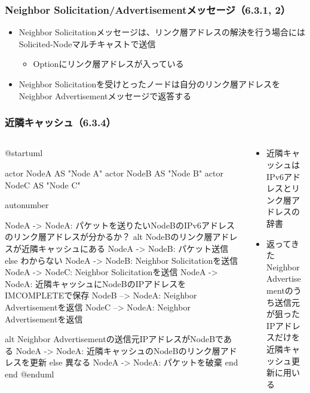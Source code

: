 \begin{frame}
  \frametitle{Neighbor Solicitation/Advertisementメッセージ（6.3.1, 2）}

  \begin{itemize}
    \item Neighbor Solicitationメッセージは、リンク層アドレスの解決を行う場合にはSolicited-Nodeマルチキャストで送信
    \begin{itemize}
      \item Optionにリンク層アドレスが入っている
    \end{itemize}

    \item Neighbor Solicitationを受けとったノードは自分のリンク層アドレスをNeighbor Advertisementメッセージで返答する
  \end{itemize}
\end{frame}

\begin{frame}[fragile]
  \frametitle{近隣キャッシュ（6.3.4）}

  \begin{columns}
    \begin{column}{0.7\textwidth}
      \begin{minipage}{\columnwidth}
        \begin{plantuml}
          @startuml

          actor NodeA AS "Node A"
          actor NodeB AS "Node B"
          actor NodeC AS "Node C"

          autonumber

          NodeA -> NodeA: パケットを送りたいNodeBのIPv6アドレスのリンク層アドレスが分かるか？
          alt NodeBのリンク層アドレスが近隣キャッシュにある
            NodeA -> NodeB: パケット送信
          else わからない
            NodeA -> NodeB: Neighbor Solicitationを送信
            NodeA -> NodeC: Neighbor Solicitationを送信
            NodeA -> NodeA: 近隣キャッシュにNodeBのIPアドレスをIMCOMPLETEで保存
            NodeB --> NodeA: Neighbor Advertisementを返信
            NodeC --> NodeA: Neighbor Advertisementを返信

            alt Neighbor Advertisementの送信元IPアドレスがNodeBである
              NodeA -> NodeA: 近隣キャッシュのNodeBのリンク層アドレスを更新
            else 異なる
              NodeA -> NodeA: パケットを破棄
            end
          end
          @enduml
        \end{plantuml}
      \end{minipage}
    \end{column}
    \begin{column}{0.3\textwidth}
      \begin{itemize}
        \item 近隣キャッシュはIPv6アドレスとリンク層アドレスの辞書

        \item 返ってきたNeighbor Advertisementのうち送信元が狙ったIPアドレスだけを
        近隣キャッシュ更新に用いる
      \end{itemize}
    \end{column}
  \end{columns}
\end{frame}

